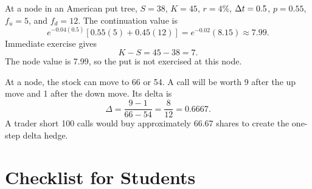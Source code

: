 \begin{exmp}
At a node in an American put tree, $S=38$, $K=45$, $r=4\%$, $\Delta t=0.5$, $p=0.55$,
$f_u=5$, and $f_d=12$. The continuation value is
\[
    e^{-0.04(0.5)}[0.55(5)+0.45(12)]
    =
    e^{-0.02}(8.15)
    \approx 7.99.
\]
Immediate exercise gives
\[
    K-S=45-38=7.
\]
The node value is 7.99, so the put is not exercised at this node.
\end{exmp}

\begin{exmp}
At a node, the stock can move to 66 or 54. A call will be worth 9 after the up
move and 1 after the down move. Its delta is
\[
    \Delta=\frac{9-1}{66-54}=\frac{8}{12}=0.6667.
\]
A trader short 100 calls would buy approximately 66.67 shares to create the
one-step delta hedge.
\end{exmp}

\section{Checklist for Students}

